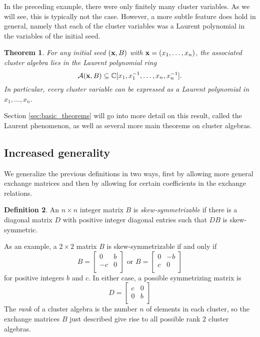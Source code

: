 \documentclass{amsart}
\newtheorem{theorem}{Theorem}[section]
\theoremstyle{definition}
\newtheorem{definition}[theorem]{Definition}
\theoremstyle{remark}
\numberwithin{equation}{section}
\newcommand{\cA}{{\mathcal{A}}}
\newcommand{\x}{{\bf x}}
\newcommand{\CC}{{\mathbb{C}}}
\begin{document}
	In the preceding example, there were only finitely many cluster variables.  As we will see, this is typically not the case.  However, a more subtle feature does hold in general, namely that each of the cluster variables was a Laurent polynomial in the variables of the initial seed.  
	\begin{theorem}\label{th:Laurent phenomenon}
		For any initial seed $(\x,B)$ with $\x = (x_1,\ldots, x_n)$, the associated cluster algebra lies in the Laurent polynomial ring
		\begin{displaymath}
			\cA(\x,B) \subseteq \CC[x_1, x_1^{-1}, \ldots, x_n, x_n^{-1}].
		\end{displaymath}
		In particular, every cluster variable can be expressed as a Laurent polynomial in $x_1,\ldots, x_n$.
	\end{theorem}
	Section \ref{sec:basic_theorems} will go into more detail on this result, called the Laurent phenomenon, as well as several more main theorems on cluster algebras.
	
	\subsection{Increased generality}
	We generalize the previous definitions in two ways, first by allowing more general exchange matrices and then by allowing for certain coefficients in the exchange relations.
	
	\begin{definition}
		An $n \times n$ integer matrix $B$ is \emph{skew-symmetrizable} if there is a diagonal matrix $D$ with positive integer diagonal entries such that $DB$ is skew-symmetric.
	\end{definition}
	
	As an example, a $2 \times 2$ matrix $B$ is skew-symmetrizable if and only if
	\begin{displaymath}
		B = \left[ \begin{array}{cc} 	0 & b \\	-c & 0 \\	\end{array}	\right]
		\textrm{ or } B = \left[ \begin{array}{cc} 	0 & -b \\	c & 0 \\	\end{array}	\right]
	\end{displaymath}
	for positive integers $b$ and $c$.  In either case, a possible symmetrizing matrix is
	\begin{displaymath}
		D = \left[ \begin{array}{cc} 	c & 0 \\	0 & b \\	\end{array}	\right]
	\end{displaymath}
	The \emph{rank} of a cluster algebra is the number $n$ of elements in each cluster, so the exchange matrices $B$ just described give rise to all possible rank $2$ cluster algebras.
	
\end{document}

